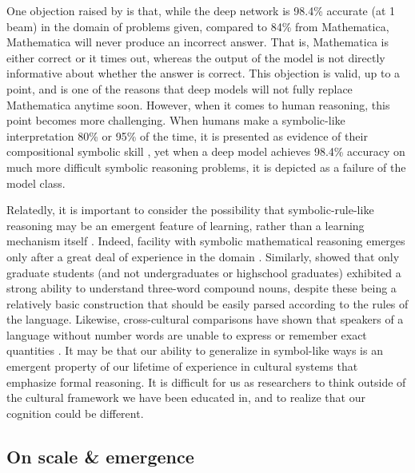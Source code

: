 One objection raised by \citet{Davis2019} is that, while the deep network is 98.4\% accurate (at 1 beam) in the domain of problems given, compared to 84\% from Mathematica, Mathematica will never produce an incorrect answer. That is, Mathematica is either correct or it times out, whereas the output of the model is not directly informative about whether the answer is correct. This objection is valid, up to a point, and is one of the reasons that deep models will not fully replace Mathematica anytime soon. However, when it comes to human reasoning, this point becomes more challenging. When humans make a symbolic-like interpretation 80\% or 95\% of the time, it is presented as evidence of their compositional symbolic skill \citep{Lake2019a}, yet when a deep model achieves 98.4\% accuracy on much more difficult symbolic reasoning problems, it is depicted as a failure of the model class. \par 
Relatedly, it is important to consider the possibility that symbolic-rule-like reasoning may be an emergent feature of learning, rather than a learning mechanism itself \citep{McClelland1999, McClelland2002, McClelland2010a}. Indeed, facility with symbolic mathematical reasoning emerges only after a great deal of experience in the domain \citep{Burger1986, McClelland2016}. Similarly, \citet{Gleitman1970} showed that only graduate students (and not undergraduates or highschool graduates) exhibited a strong ability to understand three-word compound nouns, despite these being a relatively basic construction that should be easily parsed according to the rules of the language. Likewise, cross-cultural comparisons have shown that speakers of a language without number words are unable to express or remember exact quantities \citep{Frank2008}. It may be that our ability to generalize in symbol-like ways is an emergent property of our lifetime of experience in cultural systems that emphasize formal reasoning. It is difficult for us as researchers to think outside of the cultural framework we have been educated in, and to realize that our cognition could be different. \par 

\subsection{On scale \& emergence}

